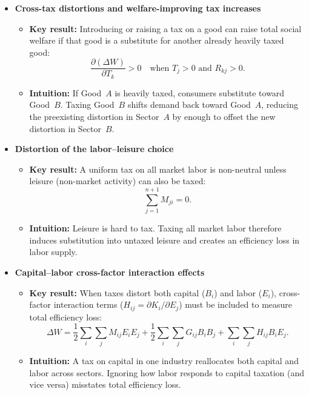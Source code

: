 \documentclass[11pt]{article}
\begin{document}
\begin{itemize}
    \item \textbf{Cross-tax distortions and welfare-improving tax increases}
    \begin{itemize}
        \item \textbf{Key result:} Introducing or raising a tax on a good can
        raise total social welfare if that good is a substitute for another
        already heavily taxed good:
        \[
        \frac{\partial (\Delta W)}{\partial T_k} > 0
        \quad\text{when } T_j > 0 \text{ and } R_{kj} > 0.
        \]
        \item \textbf{Intuition:} If Good~$A$ is heavily taxed, consumers
        substitute toward Good~$B$.  Taxing Good~$B$ shifts demand back toward
        Good~$A$, reducing the preexisting distortion in Sector~$A$ by enough
        to offset the new distortion in Sector~$B$.
    \end{itemize}

    \item \textbf{Distortion of the labor--leisure choice}
    \begin{itemize}
        \item \textbf{Key result:} A uniform tax on all market labor is
        non-neutral unless leisure (non-market activity) can also be taxed:
        \[
        \sum_{j=1}^{n+1} M_{ji} = 0.
        \]
        \item \textbf{Intuition:} Leisure is hard to tax.  Taxing all market
        labor therefore induces substitution into untaxed leisure and creates
        an efficiency loss in labor supply.
    \end{itemize}

    \item \textbf{Capital--labor cross-factor interaction effects}
    \begin{itemize}
        \item \textbf{Key result:} When taxes distort both capital ($B_i$) and
        labor ($E_i$), cross-factor interaction terms
        ($H_{ij}=\partial K_i/\partial E_j$) must be included to measure total
        efficiency loss:
        \[
        \Delta W
        = \frac{1}{2}\sum_{i}\sum_{j} M_{ij} E_i E_j
        + \frac{1}{2}\sum_{i}\sum_{j} G_{ij} B_i B_j
        + \sum_{i}\sum_{j} H_{ij} B_i E_j.
        \]
        \item \textbf{Intuition:} A tax on capital in one industry reallocates
        both capital and labor across sectors.  Ignoring how labor responds to
        capital taxation (and vice versa) misstates total efficiency loss.
    \end{itemize}
\end{itemize}
\end{document}
